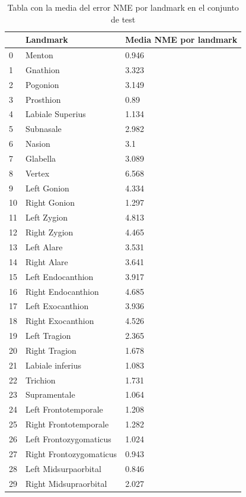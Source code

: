         \begin{table}[!ht]
            \centering
            \caption{Tabla con la media del error NME por landmark en el conjunto de test}
            \begin{tabular}{|l|l|l|}
            \hline
                ~ & Landmark & Media NME por landmark \\ \hline
                0 & Menton & 0.946 \\ \hline
                1 & Gnathion & 3.323 \\ \hline
                2 & Pogonion & 3.149 \\ \hline
                3 & Prosthion & 0.89 \\ \hline
                4 & Labiale Superius & 1.134 \\ \hline
                5 & Subnasale & 2.982 \\ \hline
                6 & Nasion & 3.1 \\ \hline
                7 & Glabella & 3.089 \\ \hline
                8 & Vertex & 6.568 \\ \hline
                9 & Left Gonion & 4.334 \\ \hline
                10 & Right Gonion & 1.297 \\ \hline
                11 & Left Zygion & 4.813 \\ \hline
                12 & Right Zygion & 4.465 \\ \hline
                13 & Left Alare & 3.531 \\ \hline
                14 & Right Alare & 3.641 \\ \hline
                15 & Left Endocanthion & 3.917 \\ \hline
                16 & Right Endocanthion & 4.685 \\ \hline
                17 & Left Exocanthion & 3.936 \\ \hline
                18 & Right Exocanthion & 4.526 \\ \hline
                19 & Left Tragion & 2.365 \\ \hline
                20 & Right Tragion & 1.678 \\ \hline
                21 & Labiale inferius & 1.083 \\ \hline
                22 & Trichion & 1.731 \\ \hline
                23 & Supramentale & 1.064 \\ \hline
                24 & Left Frontotemporale & 1.208 \\ \hline
                25 & Right Frontotemporale & 1.282 \\ \hline
                26 & Left Frontozygomaticus & 1.024 \\ \hline
                27 & Right Frontozygomaticus & 0.943 \\ \hline
                28 & Left Midsurpaorbital & 0.846 \\ \hline
                29 & Right Midsupraorbital & 2.027 \\ \hline
            \end{tabular}
            \label{table:FinalModel_landmarks}
        \end{table}
        

